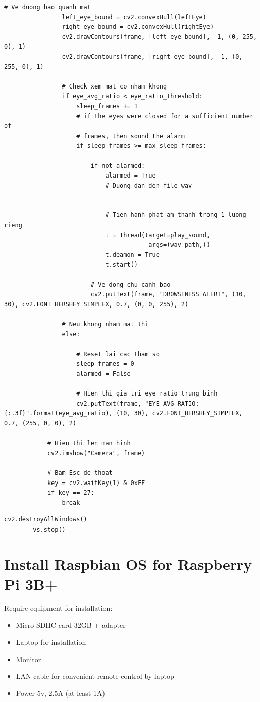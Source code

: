 \begin{lstlisting}[caption={Doc tu camera}]
                # Ve duong bao quanh mat
                left_eye_bound = cv2.convexHull(leftEye)
                right_eye_bound = cv2.convexHull(rightEye)
                cv2.drawContours(frame, [left_eye_bound], -1, (0, 255, 0), 1)
                cv2.drawContours(frame, [right_eye_bound], -1, (0, 255, 0), 1)

                # Check xem mat co nham khong
                if eye_avg_ratio < eye_ratio_threshold:
                    sleep_frames += 1
                    # if the eyes were closed for a sufficient number of
                    # frames, then sound the alarm
                    if sleep_frames >= max_sleep_frames:

                        if not alarmed:
                            alarmed = True
                            # Duong dan den file wav


                            # Tien hanh phat am thanh trong 1 luong rieng
                            t = Thread(target=play_sound,
                                        args=(wav_path,))
                            t.deamon = True
                            t.start()

                        # Ve dong chu canh bao
                        cv2.putText(frame, "DROWSINESS ALERT", (10, 30), cv2.FONT_HERSHEY_SIMPLEX, 0.7, (0, 0, 255), 2)

                # Neu khong nham mat thi
                else:

                    # Reset lai cac tham so
                    sleep_frames = 0
                    alarmed = False

                    # Hien thi gia tri eye ratio trung binh
                    cv2.putText(frame, "EYE AVG RATIO: {:.3f}".format(eye_avg_ratio), (10, 30),	cv2.FONT_HERSHEY_SIMPLEX, 0.7, (255, 0, 0), 2)

            # Hien thi len man hinh
            cv2.imshow("Camera", frame)

            # Bam Esc de thoat
            key = cv2.waitKey(1) & 0xFF
            if key == 27:
                break
    \end{lstlisting}

    \begin{lstlisting}[caption={End program}]
        cv2.destroyAllWindows()
        vs.stop()
    \end{lstlisting}

\section{Install Raspbian OS for Raspberry Pi 3B+}
    Require equipment for installation: 
    \begin{itemize}
        \item Micro SDHC card 32GB + adapter 
        \item Laptop for installation 
        \item Monitor 
        \item LAN cable for convenient remote control by laptop
        \item Power 5v, 2.5A (at least 1A) 
    \end{itemize}
